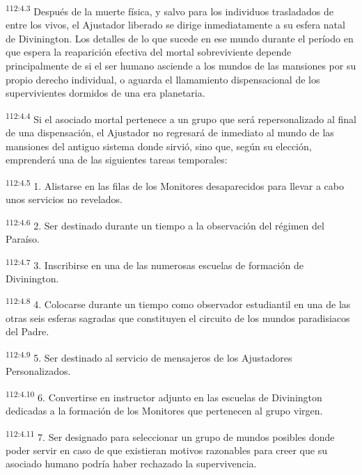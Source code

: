 \documentclass[twoside, 11pt]{book}
\begin{document}
\par
\textsuperscript{112:4.3} Después de la muerte física, y salvo para los individuos trasladados de entre los vivos, el Ajustador liberado se dirige inmediatamente a su esfera natal de Divinington. Los detalles de lo que sucede en ese mundo durante el período en que espera la reaparición efectiva del mortal sobreviviente depende principalmente de si el ser humano asciende a los mundos de las mansiones por su propio derecho individual, o aguarda el llamamiento dispensacional de los supervivientes dormidos de una era planetaria.

\par
\textsuperscript{112:4.4} Si el asociado mortal pertenece a un grupo que será repersonalizado al final de una dispensación, el Ajustador no regresará de inmediato al mundo de las mansiones del antiguo sistema donde sirvió, sino que, según su elección, emprenderá una de las siguientes tareas temporales:

\par
\textsuperscript{112:4.5} 1. Alistarse en las filas de los Monitores desaparecidos para llevar a cabo unos servicios no revelados.

\par
\textsuperscript{112:4.6} 2. Ser destinado durante un tiempo a la observación del régimen del Paraíso.

\par
\textsuperscript{112:4.7} 3. Inscribirse en una de las numerosas escuelas de formación de Divinington.

\par
\textsuperscript{112:4.8} 4. Colocarse durante un tiempo como observador estudiantil en una de las otras seis esferas sagradas que constituyen el circuito de los mundos paradisiacos del Padre.

\par
\textsuperscript{112:4.9} 5. Ser destinado al servicio de mensajeros de los Ajustadores Personalizados.

\par
\textsuperscript{112:4.10} 6. Convertirse en instructor adjunto en las escuelas de Divinington dedicadas a la formación de los Monitores que pertenecen al grupo virgen.

\par
\textsuperscript{112:4.11} 7. Ser designado para seleccionar un grupo de mundos posibles donde poder servir en caso de que existieran motivos razonables para creer que su asociado humano podría haber rechazado la supervivencia.
\end{document}
